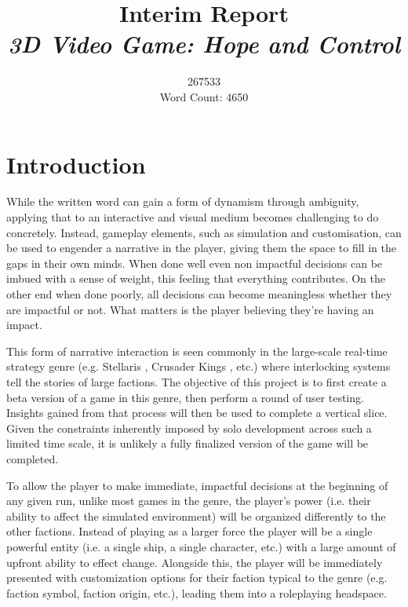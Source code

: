 \documentclass{report}
\begin{document}
\title{
Interim Report \\ 
\textit{3D Video Game: Hope and Control} }
\author{267533\\
\large Word Count: 4650}

\maketitle

\tableofcontents

\chapter{Introduction}
While the written word can gain a form of dynamism through ambiguity, applying that to an interactive and visual medium becomes challenging to do concretely. Instead, gameplay elements, such as simulation and customisation, can be used to engender a narrative in the player, giving them the space to fill in the gaps in their own minds. When done well even non impactful decisions can be imbued with a sense of weight, this feeling that everything contributes. On the other end when done poorly, all decisions can become meaningless whether they are impactful or not. What matters is the player believing they're having an impact. 

This form of narrative interaction is seen commonly in the large-scale real-time strategy genre (e.g. Stellaris \cite{stellaris}, Crusader Kings \cite{crusaderkings}, etc.) where interlocking systems tell the stories of large factions. The objective of this project is to first create a beta version of a game in this genre, then perform a round of user testing. Insights gained from that process will then be used to complete a vertical slice. Given the constraints inherently imposed by solo development across such a limited time scale, it is unlikely a fully finalized version of the game will be completed.

To allow the player to make immediate, impactful decisions at the beginning of any given run, unlike most games in the genre, the player's power (i.e. their ability to affect the simulated environment) will be organized differently to the other factions. Instead of playing as a larger force the player will be a single powerful entity (i.e. a single ship, a single character, etc.) with a large amount of upfront ability to effect change. Alongside this, the player will be immediately presented with customization options for their faction typical to the genre (e.g. faction symbol, faction origin, etc.), leading them into a roleplaying headspace. 
\end{document}
